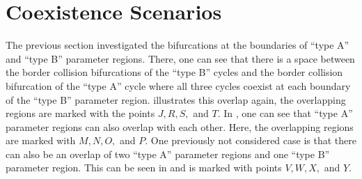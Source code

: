 \section{Coexistence Scenarios}
\label{sec:arch.coex}

The previous section investigated the bifurcations at the boundaries of ``type A'' and ``type B'' parameter regions.
There, one can see that there is a space between the border collision bifurcations of the ``type B'' cycles and the border collision bifurcation of the ``type A'' cycle where all three cycles coexist at each boundary of the ``type B'' parameter region.
 illustrates this overlap again, the overlapping regions are marked with the points $J, R, S,$ and $T$.
In , one can see that ``type A'' parameter regions can also overlap with each other.
Here, the overlapping regions are marked with $M, N, O,$ and $P$.
One previously not considered case is that there can also be an overlap of two ``type A'' parameter regions and one ``type B'' parameter region.
This can be seen in  and is marked with points $V, W, X,$ and $Y$.

